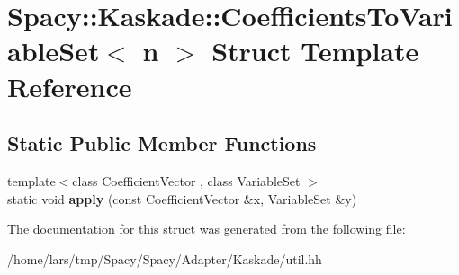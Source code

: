 \hypertarget{structSpacy_1_1Kaskade_1_1CoefficientsToVariableSet}{}\section{Spacy\+:\+:Kaskade\+:\+:Coefficients\+To\+Variable\+Set$<$ n $>$ Struct Template Reference}
\label{structSpacy_1_1Kaskade_1_1CoefficientsToVariableSet}
\subsection*{Static Public Member Functions}
\begin{DoxyCompactItemize}
\item 
{\footnotesize template$<$class Coefficient\+Vector , class Variable\+Set $>$ }\\static void {\bfseries apply} (const Coefficient\+Vector \&x, Variable\+Set \&y)\hypertarget{structSpacy_1_1Kaskade_1_1CoefficientsToVariableSet_ae781a8e6bdd675c290d92b32c8f365a2}{}\label{structSpacy_1_1Kaskade_1_1CoefficientsToVariableSet_ae781a8e6bdd675c290d92b32c8f365a2}

\end{DoxyCompactItemize}


The documentation for this struct was generated from the following file\+:\begin{DoxyCompactItemize}
\item 
/home/lars/tmp/\+Spacy/\+Spacy/\+Adapter/\+Kaskade/util.\+hh\end{DoxyCompactItemize}
